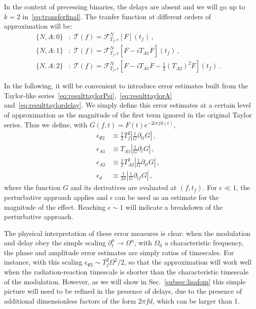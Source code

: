 \documentclass[aps,showpacs,twocolumn,
prd,superscriptaddress,nofootinbib]{revtex4-1}
\newcommand\calF{{\mathcal{F}}}
\newcommand\calT{{\mathcal{T}}}
\newcommand{\Tf}{T_{f}}
\begin{document}
In the context of precessing binaries, the delays are absent and we will go up to $k=2$ in~\eqref{eq:transferfinal}. The tranfer function at different orders of approximation will be:
\begin{subequations}
\begin{align}
	\{N,A:0\}&: \; \calT(f) = \calF^{N}_{\Tf, \epsilon} \left[ F \right] (t_{f}) \,, \\
	\{N,A:1\}&: \; \calT(f) = \calF^{N}_{\Tf, \epsilon} \left[ F - i T_{A1} \dot{F} \right] (t_{f}) \,, \\
	\{N,A:2\}&: \; \calT(f) = \calF^{N}_{\Tf, \epsilon} \left[ F - i T_{A1} \dot{F} - \frac{1}{2} (T_{A2})^{2} \ddot{F} \right] (t_{f}) \,.
\end{align}
\end{subequations}

In the following, it will be convenient to introduce error estimates built from the Taylor-like series~\eqref{eq:resulttaylorPsi},~\eqref{eq:resulttaylorA} and~\eqref{eq:resulttaylordelay}. We simply define  this error estimates at a certain level of approximation as the magnitude of the first term ignored in the original Taylor series. Thus we define, with $G(f,t) = F(t) e^{-2i\pi f d(t)}$,
\begin{subequations}\label{eq:deffom}
\begin{align}
	\epsilon_{\Psi 2} &\equiv \frac{1}{2} \Tf^{2} \left| \frac{1}{G}\partial_{tt}G \right| \,, \\
	\epsilon_{A 1} &\equiv T_{A1} \left| \frac{1}{G} \partial_{t} G \right| \,, \\
	\epsilon_{A 2} &\equiv \frac{1}{2} T_{A2}^{2} \left| \frac{1}{G} \partial_{tt}G \right| \,, \\
	\epsilon_{d} &\equiv \frac{1}{2\pi} \left| \frac{1}{G} \partial_{tf} G \right| \,,
\end{align}
\end{subequations}
where the function $G$ and its derivatives are evaluated at $(f, t_{f})$. For $\epsilon \ll 1$, the perturbative approach applies and $\epsilon$ can be used as an estimate for the magnitude of the effect. Reaching $\epsilon \sim 1$ will indicate a breakdown of the perturbative approach.

The physical interpretation of these error measures is clear: when the modulation and delay obey the simple scaling $\partial_{t}^{n} \rightarrow \Omega^{n}$, with $\Omega_{0}$ a characteristic frequency, the phase and amplitude error estimates are simply ratios of timescales. For instance, with this scaling $\epsilon_{\Psi 2} \sim T_{f}^{2}\Omega^{2}/2$, so that the approximation will work well when the radiation-reaction timescale is shorter than the characteristic timescale of the modulation. However, as we will show in Sec.~\ref{subsec:lisafom} this simple picture will need to be refined in the presence of delays, due to the presence of additional dimensionless factors of the form $2\pi f d$, which can be larger than 1.
\end{document}

